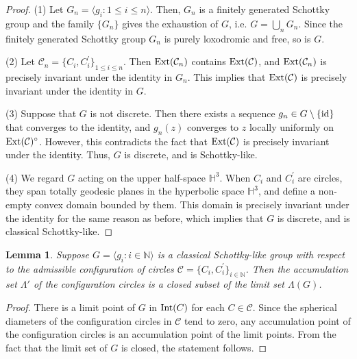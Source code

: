 \documentclass[12pt]{amsart}
\theoremstyle{plain}
\newtheorem{lem}[thm]{Lemma}
\DeclareMathOperator{\Int}{\rm Int}
\DeclareMathOperator{\Ext}{\rm Ext}
\begin{document}
\begin{proof}
(1) Let $G_n=\langle g_i :1 \leq i  \leq n \rangle$. Then, $G_n$ is a finitely generated Schottky group and
 the family $\{G_n\}$ gives the exhaustion of $G$, i.e. $G=\bigcup_n G_n$.
 Since the finitely generated Schottky group $G_n$ is purely loxodromic and free, so is $G$.
 
(2) Let $\mathcal{C}_n=\{C_i ,C_i ^{\prime}\}_{1 \leq i \leq n}$. Then $\Ext (\mathcal{C}_n)$ contains 
 $\Ext (\mathcal{C})$, and $\Ext (\mathcal{C}_n)$ is precisely invariant under the identity in $G_n$.
 This implies that $\Ext (\mathcal{C})$ is precisely invariant under the identity in $G$.

(3) Suppose that $G$ is not discrete. Then there exists a sequence $g_n \in G \setminus \{\rm id\}$ that converges to the identity, and 
$g_n(z)$ converges to $z$ locally uniformly on $\Ext (\mathcal{C})^{\circ}$. However, this contradicts the fact that $\Ext (\mathcal{C})$ is precisely
invariant under the identity. Thus, $G$ is discrete, and is Schottky-like.

(4) We regard $G$ acting on the upper half-space $\mathbb H^3$. 
When $C_i$ and $C_i ^{\prime}$
are circles, they span totally geodesic planes in the hyperbolic space $\mathbb H^3$, and
define a non-empty convex domain bounded by them. 
This domain is precisely invariant under the identity
for the same reason as before, which implies that $G$ is discrete, and is classical Schottky-like.
\end{proof}

\begin{lem} \label{lem: basics2}  Suppose 
  $G =\langle g_i :i \in \mathbb N\rangle$ is a classical Schottky-like group with respect to 
  the admissible configuration of circles $\mathcal{C}=\{C_i ,C_i ^{\prime}\}_{i \in \mathbb N}$. Then
  the accumulation set $\Lambda'$ of the configuration circles is a closed subset of the limit set $\Lambda(G)$.
  \end{lem}
  
  \begin{proof}
  There is a limit point of $G$ in $\Int(C)$ for each $C \in \mathcal C$. Since the spherical diameters of
  the configuration circles in $\mathcal C$ tend to zero, any accumulation point of the configuration circles
  is an accumulation point of the limit points. From the fact that the limit set of $G$ is closed,
  the statement follows. 
  \end{proof}
\end{document}
